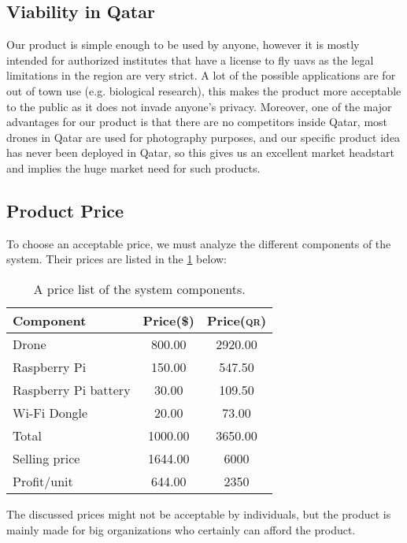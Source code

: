 \documentclass[../main.tex]{subfiles}
\begin{document}
\subsection{Viability in Qatar}
	Our product is simple enough to be used by anyone, however it is mostly intended for 
	authorized institutes that have a license to fly \glspl{uav} as the legal limitations 
	in the region are very strict. 
	A lot of the possible applications are for out of town use (e.g. biological research), 
	this makes the product more acceptable to the public as it does not invade anyone's privacy.
	Moreover, one of the major advantages for our product is that there are no competitors 
	inside Qatar, most drones in Qatar are used for photography purposes, and our
	specific product idea has never been deployed in Qatar, so this gives us an excellent 
	market headstart and implies the huge market need for such products.
\subsection{Product Price}
To choose an acceptable price, we must analyze the different components of the system. Their prices are listed in the \cref{tab:components-prices} below:
	\\
	\begin{table}[H]
		\begin{center}
			\caption{A price list of the system components.}
			\label{tab:components-prices}
			\begin{tabular}{p{3.5cm} c c} 
                            \toprule
                            \textbf{Component} & \textbf{Price(\$)} & \textbf{Price(\textsc{qr})}\\
				\midrule
				\anafi Drone & 800.00 & 2920.00 \\
				Raspberry Pi & 150.00 & 547.50 \\
				Raspberry Pi battery & 30.00 & 109.50\\
				Wi-Fi Dongle & 20.00 & 73.00\\
				\hline 
				Total & 1000.00 & 3650.00 \\
				Selling price & 1644.00 & 6000 \\ 
				Profit/unit & 644.00 & 2350 \\
				\bottomrule
			\end{tabular}
		\end{center}
	\end{table}

	The discussed prices might not be acceptable by individuals, but the product is mainly made for big organizations who certainly can afford the product.
	
\end{document}
